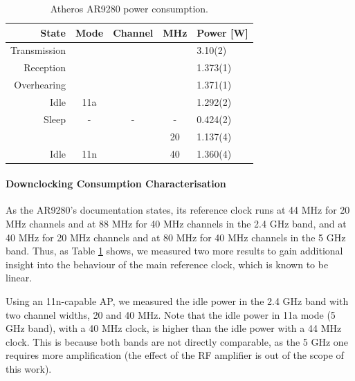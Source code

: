 \documentclass[twoside,nohyper]{tufte-book}
\begin{document}
\begin{table}

\begin{center}
\begin{tabular}{rcccl}
\toprule
State & Mode & Channel & MHz & Power [W]\\
\midrule
Transmission &  &  &  & 3.10(2)\\

Reception &  &  &  & 1.373(1)\\

Overhearing &  &  &  & 1.371(1)\\

Idle & \multirow{-4}{*}{\centering\arraybackslash 11a} & \multirow{-4}{*}{\centering\arraybackslash 44} & \multirow{-4}{*}{\centering\arraybackslash 20} & 1.292(2)\\
\cmidrule{1-5}
Sleep & - & - & - & 0.424(2)\\
\cmidrule{1-5}
 &  &  & 20 & 1.137(4)\\

\multirow{-2}{*}{\raggedleft\arraybackslash Idle} & \multirow{-2}{*}{\centering\arraybackslash 11n} & \multirow{-2}{*}{\centering\arraybackslash 11} & 40 & 1.360(4)\\
\bottomrule
\end{tabular}
\end{center}
\caption{\label{tab:powert}Atheros AR9280 power consumption.}
\end{table}

\hypertarget{downclocking-consumption-characterisation}{%
\paragraph{Downclocking Consumption Characterisation}\label{downclocking-consumption-characterisation}}

As the AR9280's documentation states, its reference clock runs at 44 MHz for 20 MHz channels and at 88 MHz for 40 MHz channels in the 2.4 GHz band, and at 40 MHz for 20 MHz channels and at 80 MHz for 40 MHz channels in the 5 GHz band. Thus, as Table \ref{tab:powert} shows, we measured two more results to gain additional insight into the behaviour of the main reference clock, which is known to be linear\cite[0pt]{Zhang2012}.

Using an 11n-capable AP, we measured the idle power in the 2.4 GHz band with two channel widths, 20 and 40 MHz. Note that the idle power in 11a mode (5 GHz band), with a 40 MHz clock, is higher than the idle power with a 44 MHz clock. This is because both bands are not directly comparable, as the 5 GHz one requires more amplification (the effect of the RF amplifier is out of the scope of this work).
\end{document}
